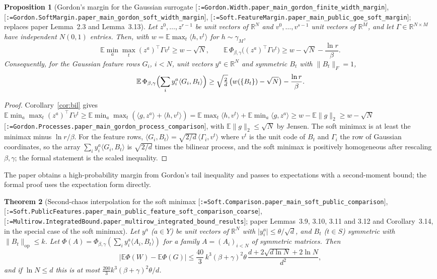 \documentclass[11pt]{article}
\makeatletter
\newcommand{\formal@break}[1]{\@tfor\formal@tok:=#1\do{%
  \formal@tok
  \expandafter\ifx\formal@tok.\allowbreak\else
  \expandafter\ifx\formal@tok\_\allowbreak\fi\fi}}
\DeclareRobustCommand{\formal}[1]{\textnormal{[\texttt{\small\formal@break{#1}}]}}
\newcommand{\R}{\mathbb{R}}
\newcommand{\E}{\mathbb{E}}
\newcommand{\ip}[2]{\langle #1, #2\rangle}
\newcommand{\norm}[1]{\lVert #1\rVert}
\newcommand{\abs}[1]{\lvert #1\rvert}
\newcommand{\op}{\mathrm{op}}
\newcommand{\Fro}{F}
\newcommand{\sqd}{\sqrt{d}}
\newcommand{\gauss}{\gamma}
\theoremstyle{plain}
\newtheorem{theorem}{Theorem}[section]
\newtheorem{proposition}[theorem]{Proposition}
\theoremstyle{definition}
\makeatother
\begin{document}
\begin{proposition}[Gordon's margin for the Gaussian surrogate \formal{Gordon.Width.paper\_main\_gordon\_finite\_width\_margin}, \formal{Gordon.SoftMargin.paper\_main\_gordon\_soft\_width\_margin}, \formal{Soft.FeatureMargin.paper\_main\_public\_goe\_soft\_margin}; replaces paper Lemma~2.3 and Lemma~3.13]\label{prop:gordon_margin}
Let $z^0, \dots, z^{r-1}$ be unit vectors of $\R^N$ and $v^0, \dots, v^{s-1}$ unit
vectors of $\R^M$, and let $\Gamma \in \R^{N\times M}$ have independent
$N(0,1)$ entries. Then, with $w = \E\max_t\ip{h}{v^t}$ for $h \sim \gauss_M$,
\[
\E\min_a\max_t (z^a)^{\top}\Gamma v^t \ge w - \sqrt N,
\qquad
\E\,\Phi_{\beta,\gamma}\bigl((z^a)^{\top}\Gamma v^t\bigr) \ge w - \sqrt N - \frac{\ln r}{\beta}.
\]
Consequently, for the Gaussian feature rows $G_i$, $i < N$, unit vectors
$y^a \in \R^N$ and symmetric $B_t$ with $\norm{B_t}_\Fro = 1$,
\[
\E\,\Phi_{\beta,\gamma}\Bigl(\sum_iy^a_i\ip{G_i}{B_t}\Bigr) \ge \sqrt{\tfrac2d}\,\bigl(w(\{B_t\}) - \sqrt N\bigr) - \frac{\ln r}{\beta}.
\]
\end{proposition}

\begin{proof}
Corollary~\ref{cor:bil} gives
$\E\min_a\max_t(z^a)^{\top}\Gamma v^t \ge \E\min_a\max_t(\ip{g}{z^a} + \ip{h}{v^t}) = \E\max_t\ip{h}{v^t} + \E\min_a\ip{g}{z^a} \ge w - \E\norm{g}_2 \ge w - \sqrt N$
\formal{Gordon.Processes.paper\_main\_gordon\_process\_comparison}, with
$\E\norm{g}_2 \le \sqrt N$ by Jensen. The soft minimax is at least the
minimax minus $\ln r/\beta$. For the feature rows,
$\ip{G_i}{B_t} = \sqrt{2/d}\,\ip{\Gamma_i}{v^t}$ where $v^t$ is the unit code
of $B_t$ and $\Gamma_i$ the row of Gaussian coordinates, so the array
$\sum_iy^a_i\ip{G_i}{B_t}$ is $\sqrt{2/d}$ times the bilinear process, and
the soft minimax is positively homogeneous after rescaling $\beta, \gamma$;
the formal statement is the scaled inequality.
\end{proof}

The paper obtains a high-probability margin from Gordon's tail inequality
and passes to expectations with a second-moment bound; the formal proof
uses the expectation form directly.

\begin{theorem}[Second-chaos interpolation for the soft minimax \formal{Soft.Comparison.paper\_main\_soft\_public\_comparison}, \formal{Soft.PublicFeatures.paper\_main\_public\_feature\_soft\_comparison\_coarse}, \formal{Multirow.IntegratedBound.paper\_multirow\_integrated\_bound\_results}; paper Lemmas~3.9, 3.10, 3.11 and 3.12 and Corollary~3.14, in the special case of the soft minimax]\label{thm:interp_soft}
Let $y^a$ ($a \in Y$) be unit vectors of $\R^N$ with $\abs{y^a_i} \le \theta/\sqd$,
and $B_t$ ($t \in S$) symmetric with $\norm{B_t}_\op \le k$. Let
$\Phi(A) = \Phi_{\beta,\gamma}(\sum_iy^a_i\ip{A_i}{B_t})$ for a family
$A = (A_i)_{i<N}$ of symmetric matrices. Then
\[
\abs{\E\Phi(W) - \E\Phi(G)} \le \frac{40}{3}\,k^3(\beta + \gamma)^2\theta\,\frac{d + 2\sqrt{d\ln N} + 2\ln N}{d^2},
\]
and if $\ln N \le d$ this is at most $\frac{200}{3}k^3(\beta + \gamma)^2\theta/d$.
\end{theorem}
\end{document}
